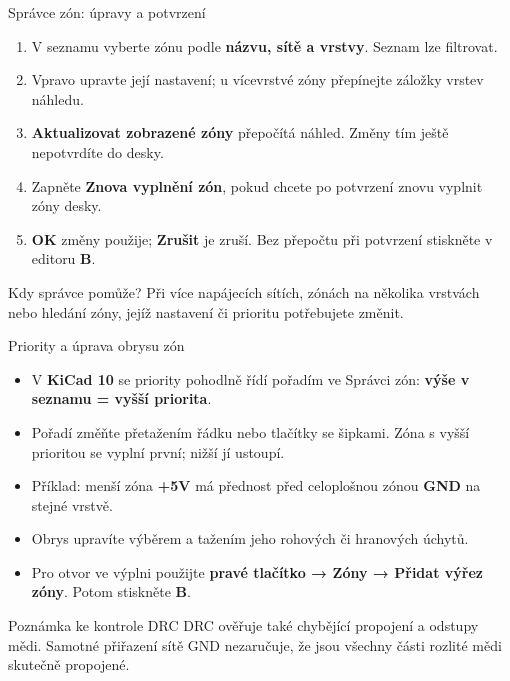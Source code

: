 \documentclass{beamer}
\begin{document}
\begin{frame}[t]{Správce zón: úpravy a potvrzení}
	\begin{enumerate}
		\item V seznamu vyberte zónu podle \textbf{názvu, sítě a vrstvy}. Seznam lze filtrovat.
		\item Vpravo upravte její nastavení; u vícevrstvé zóny přepínejte záložky vrstev náhledu.
		\item \textbf{Aktualizovat zobrazené zóny} přepočítá náhled. Změny tím ještě nepotvrdíte do desky.
		\item Zapněte \textbf{Znova vyplnění zón}, pokud chcete po potvrzení znovu vyplnit zóny desky.
		\item \textbf{OK} změny použije; \textbf{Zrušit} je zruší. Bez přepočtu při potvrzení stiskněte v editoru \textbf{B}.
	\end{enumerate}
	\begin{block}{Kdy správce pomůže?}
	Při více napájecích sítích, zónách na několika vrstvách nebo hledání zóny, jejíž nastavení či prioritu potřebujete změnit.
	\end{block}
\end{frame}

\begin{frame}[t]{Priority a úprava obrysu zón}
	\small
	\begin{itemize}
		\item V \textbf{KiCad 10} se priority pohodlně řídí pořadím ve Správci zón: \textbf{výše v seznamu = vyšší priorita}.
		\item Pořadí změňte přetažením řádku nebo tlačítky se šipkami. Zóna s vyšší prioritou se vyplní první; nižší jí ustoupí.
		\item Příklad: menší zóna \textbf{+5V} má přednost před celoplošnou zónou \textbf{GND} na stejné vrstvě.
		\item Obrys upravíte výběrem a tažením jeho rohových či hranových úchytů.
		\item Pro otvor ve výplni použijte \textbf{pravé tlačítko → Zóny → Přidat výřez zóny}. Potom stiskněte \textbf{B}.
	\end{itemize}
	\begin{block}{Poznámka ke kontrole DRC}
	DRC ověřuje také chybějící propojení a odstupy mědi. Samotné přiřazení sítě GND nezaručuje, že jsou všechny části rozlité mědi skutečně propojené.
	\end{block}
\end{frame}
\end{document}

